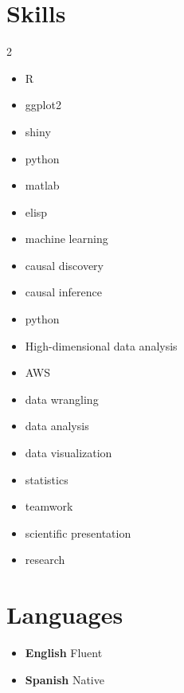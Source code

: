 \documentclass{moderncv}
\begin{document}

\section{Skills}
\label{sec:org3e62b7d}
\begin{multicols}{2}
\begin{itemize}
\item R
\item ggplot2
\item shiny
\item python
\item matlab
\item elisp
\item machine learning
\item causal discovery
\item causal inference
\item python
\item High-dimensional data analysis
\item AWS
\item data wrangling
\item data analysis
\item data visualization
\item statistics
\item teamwork
\item scientific presentation
\item research
\end{itemize}
\end{multicols}


\section{Languages}
\label{sec:org04911b8}
\begin{itemize}
\item \textbf{English} Fluent
\item \textbf{Spanish} Native
\end{itemize}


\begin{refsection}
\nocite{*}

\printbibliography[title={Selected Publications}]
\end{refsection}
\end{document}
